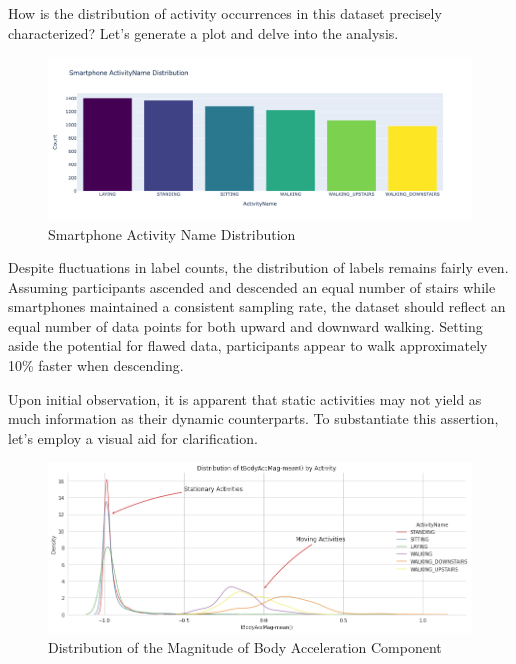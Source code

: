 \documentclass[conference]{IEEEtran}
\begin{document}
How is the distribution of activity occurrences in this dataset precisely characterized? Let's generate a plot and delve into the analysis.

\begin{figure}[h!]
	\includegraphics[width= 1.0 \linewidth]{smartphone_activity_name_distribution.png}
	\centering
	\caption{Smartphone Activity Name Distribution}
	\label{smartphone_activity_name_distribution.png}
\end{figure}

Despite fluctuations in label counts, the distribution of labels remains fairly even. Assuming participants ascended and descended an equal number of stairs while smartphones maintained a consistent sampling rate, the dataset should reflect an equal number of data points for both upward and downward walking. Setting aside the potential for flawed data, participants appear to walk approximately 10\% faster when descending. \newline 


Upon initial observation, it is apparent that static activities may not yield as much information as their dynamic counterparts. To substantiate this assertion, let's employ a visual aid for clarification. \newline 

\begin{figure}[h!]
	\includegraphics[width= 1.0 \linewidth]{distribution_acc_activity.png}
	\centering
	\caption{Distribution of the Magnitude of Body Acceleration Component}
	\label{distribution_acc_activity.png}
\end{figure}
\end{document}
